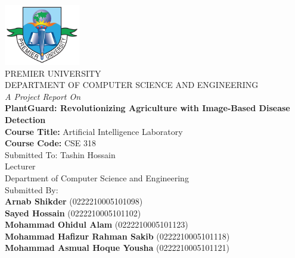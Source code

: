 
\thispagestyle{empty} %



{
	\thispagestyle{empty}
	\centering
	\normalsize
	  
        \includegraphics[width=1.3in]{Images/PUClogo.png}\\

	{PREMIER UNIVERSITY}\\
	{DEPARTMENT OF COMPUTER SCIENCE AND ENGINEERING}\\
	
	{\textit{A Project Report On}\\
	{\bf PlantGuard: Revolutionizing Agriculture with Image-Based Disease Detection}\\[1.5cm]

     {\bf Course Title:} Artificial Intelligence Laboratory\\
     {\bf Course Code:}  CSE 318\\[1.5cm]

        Submitted To: 
          Tashin Hossain\\
          Lecturer \\
          Department of Computer Science and Engineering\\[1.5cm]
    
	
	Submitted By:\\
        {\bf Arnab Shikder} (0222210005101098)\\
        {\bf Sayed Hossain} (0222210005101102)\\
        {\bf Mohammad Ohidul Alam} (0222210005101123)\\
	{\bf Mohammad Hafizur Rahman Sakib} (0222210005101118)\\
        {\bf Mohammad Asmual Hoque Yousha} (0222210005101121)\\[3.5cm]
	
}

}

